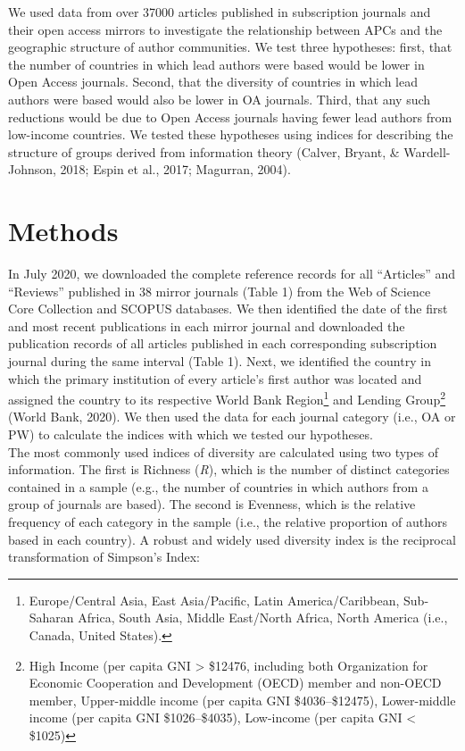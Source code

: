 \documentclass[
  english,
  man]{apa6}
\begin{document}
We used data from over 37000 articles published in subscription journals and their open access mirrors to investigate the relationship between APCs and the geographic structure of author communities. We test three hypotheses: first, that the number of countries in which lead authors were based would be lower in Open Access journals. Second, that the diversity of countries in which lead authors were based would also be lower in OA journals. Third, that any such reductions would be due to Open Access journals having fewer lead authors from low-income countries. We tested these hypotheses using indices for describing the structure of groups derived from information theory (Calver, Bryant, \& Wardell-Johnson, 2018; Espin et al., 2017; Magurran, 2004).

\hypertarget{methods}{%
\section{Methods}\label{methods}}

In July 2020, we downloaded the complete reference records for all \enquote{Articles} and \enquote{Reviews} published in 38 mirror journals (Table 1) from the Web of Science Core Collection and SCOPUS databases. We then identified the date of the first and most recent publications in each mirror journal and downloaded the publication records of all articles published in each corresponding subscription journal during the same interval (Table 1). Next, we identified the country in which the primary institution of every article's first author was located and assigned the country to its respective World Bank Region\footnote{Europe/Central Asia, East Asia/Pacific, Latin America/Caribbean, Sub-Saharan Africa, South Asia, Middle East/North Africa, North America (i.e., Canada, United States).} and Lending Group\footnote{High Income (per capita GNI \textgreater{} \$12476, including both Organization for Economic Cooperation and Development (OECD) member and non-OECD member, Upper-middle income (per capita GNI \$4036--\$12475), Lower-middle income (per capita GNI \$1026--\$4035), Low-income (per capita GNI \textless{} \$1025)} (World Bank, 2020). We then used the data for each journal category (i.e., OA or PW) to calculate the indices with which we tested our hypotheses.\\
The most commonly used indices of diversity are calculated using two types of information. The first is Richness (\emph{R}), which is the number of distinct categories contained in a sample (e.g., the number of countries in which authors from a group of journals are based). The second is Evenness, which is the relative frequency of each category in the sample (i.e., the relative proportion of authors based in each country). A robust and widely used diversity index is the reciprocal transformation of Simpson's Index:
\end{document}
